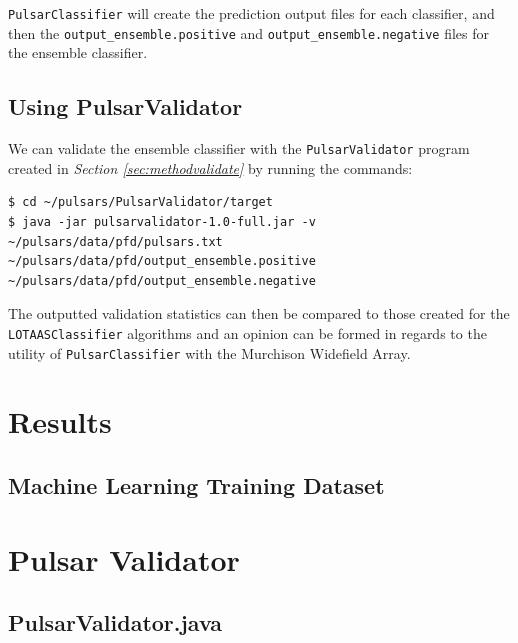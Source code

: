 \documentclass{article}
\begin{document}
\begin{appendices}
\begin{subappendices}
\verb|PulsarClassifier| will create the prediction output files for each classifier, and then the \verb|output_ensemble.positive| and \verb|output_ensemble.negative| files for the ensemble classifier. 

\subsection{Using PulsarValidator}
\label{apndx:usepulsarvalidator}
We can validate the ensemble classifier with the \verb|PulsarValidator| program created in \emph{Section \ref{sec:methodvalidate}} by running the commands:

\begin{lstlisting}[numbers=none]
$ cd ~/pulsars/PulsarValidator/target
$ java -jar pulsarvalidator-1.0-full.jar -v ~/pulsars/data/pfd/pulsars.txt ~/pulsars/data/pfd/output_ensemble.positive ~/pulsars/data/pfd/output_ensemble.negative
\end{lstlisting}

The outputted validation statistics can then be compared to those created for the \verb|LOTAASClassifier| algorithms and an opinion can be formed in regards to the utility of \verb|PulsarClassifier| with the Murchison Widefield Array.

    \end{subappendices}

    \section{Results}
    \subsection{Machine Learning Training Dataset}
    \label{sec:training}
    

    \pagebreak
    \section{Pulsar Validator}
    \begin{subappendices}
        \label{src:pulsarvalidator} 
        \subsection{PulsarValidator.java}
        


\end{subappendices}
\end{appendices}
\end{document}
